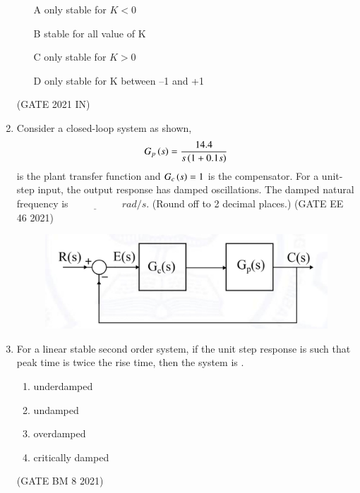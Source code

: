 \begin{enumerate}[label=\thechapter.\arabic*,ref=\thechapter.\theenumi]
\begin{enumerate}
\item[A]only stable for $K < 0$
\item[B]stable for all value of K
\item[C]only stable for $K > 0$
\item[D]only stable for K between –1 and +1
\end{enumerate}
\hfill(GATE 2021 IN)\\
\solution

\pagebreak
\item Consider a closed-loop system as shown, $$G_p\left(s\right)= \frac{14.4}{s\left(1+0.1s\right)}$$ is the plant transfer function and $G_c\left(s\right)=1$ is the compensator. For a unit-step input, the output response has damped oscillations. The damped natural frequency is $\underline{\hspace{2cm}}$
$rad/s$. (Round off to 2 decimal places.) 
\hfill(GATE EE 46 2021)

\begin{figure}[h]
    \centering  
\includegraphics[width=\columnwidth]{2021/EE/46/figs/dia.png}
    \label{fig:ee.46.2021}
\end{figure}
\solution 

\pagebreak

\item  For a linear stable second order system, if the unit step response is such that peak time is twice the rise time, then the system is . 
    \begin{enumerate}
    \item underdamped\\
    \item undamped\\
    \item overdamped\\
    \item critically damped\\
    \end{enumerate} \hfill(GATE BM 8 2021)\\
    \solution
    
\end{enumerate}
